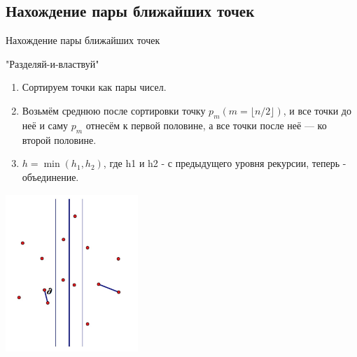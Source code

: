 \documentclass[10pt]{beamer}
\begin{document}
\subsection{Нахождение пары ближайших точек}
\begin{frame}[fragile]{Нахождение пары ближайших точек}
\begin{multicols}{2}
"Разделяй-и-властвуй"
\begin{enumerate}
    \item Сортируем точки как пары чисел.
    \item Возьмём среднюю после сортировки точку $p_m (m = \lfloor n/2 \rfloor)$, и все точки до неё и саму $p_m$ отнесём к первой половине, а все точки после неё — ко второй половине.
    \item $h=\min (h_1, h_2)$, где h1 и h2 - с предыдущего уровня рекурсии, теперь - объединение.
\end{enumerate}
\vfill\eject
\includegraphics[width=5cm, height=6cm]{Term_3/Source/Pictures/geometry_points1.jpg}
\end{multicols}
\end{frame}
\end{document}
